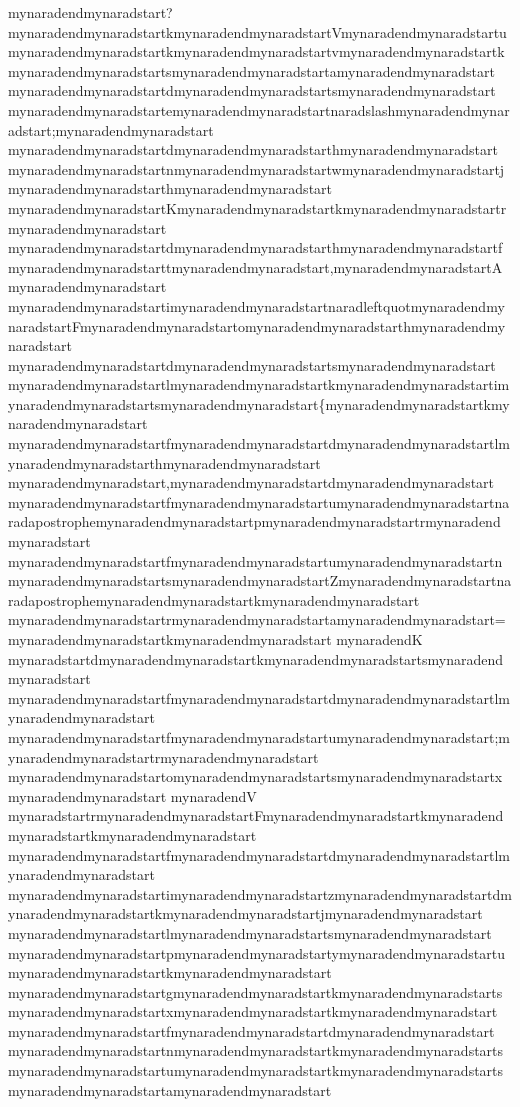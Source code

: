 \documentclass{scrbook}
\begin{document}
mynaradendmynaradstart?mynaradendmynaradstartkmynaradendmynaradstartVmynaradendmynaradstartumynaradendmynaradstartkmynaradendmynaradstartvmynaradendmynaradstartkmynaradendmynaradstartsmynaradendmynaradstartamynaradendmynaradstart mynaradendmynaradstartdmynaradendmynaradstartsmynaradendmynaradstart mynaradendmynaradstartemynaradendmynaradstartnaradslashmynaradendmynaradstart;mynaradendmynaradstart mynaradendmynaradstartdmynaradendmynaradstarthmynaradendmynaradstart mynaradendmynaradstartnmynaradendmynaradstartwmynaradendmynaradstartjmynaradendmynaradstarthmynaradendmynaradstart mynaradendmynaradstartKmynaradendmynaradstartkmynaradendmynaradstartrmynaradendmynaradstart mynaradendmynaradstartdmynaradendmynaradstarthmynaradendmynaradstartfmynaradendmynaradstarttmynaradendmynaradstart,mynaradendmynaradstartAmynaradendmynaradstart mynaradendmynaradstartimynaradendmynaradstartnaradleftquotmynaradendmynaradstartFmynaradendmynaradstartomynaradendmynaradstarthmynaradendmynaradstart mynaradendmynaradstartdmynaradendmynaradstartsmynaradendmynaradstart mynaradendmynaradstartlmynaradendmynaradstartkmynaradendmynaradstartimynaradendmynaradstartsmynaradendmynaradstart\{mynaradendmynaradstartkmynaradendmynaradstart mynaradendmynaradstartfmynaradendmynaradstartdmynaradendmynaradstartlmynaradendmynaradstarthmynaradendmynaradstart mynaradendmynaradstart,mynaradendmynaradstartdmynaradendmynaradstart mynaradendmynaradstartfmynaradendmynaradstartumynaradendmynaradstartnaradapostrophemynaradendmynaradstartpmynaradendmynaradstartrmynaradendmynaradstart mynaradendmynaradstartfmynaradendmynaradstartumynaradendmynaradstartnmynaradendmynaradstartsmynaradendmynaradstartZmynaradendmynaradstartnaradapostrophemynaradendmynaradstartkmynaradendmynaradstart mynaradendmynaradstartrmynaradendmynaradstartamynaradendmynaradstart=mynaradendmynaradstartkmynaradendmynaradstart mynaradendK mynaradstartdmynaradendmynaradstartkmynaradendmynaradstartsmynaradendmynaradstart mynaradendmynaradstartfmynaradendmynaradstartdmynaradendmynaradstartlmynaradendmynaradstart mynaradendmynaradstartfmynaradendmynaradstartumynaradendmynaradstart;mynaradendmynaradstartrmynaradendmynaradstart mynaradendmynaradstartomynaradendmynaradstartsmynaradendmynaradstartxmynaradendmynaradstart mynaradendV mynaradstartrmynaradendmynaradstartFmynaradendmynaradstartkmynaradendmynaradstartkmynaradendmynaradstart mynaradendmynaradstartfmynaradendmynaradstartdmynaradendmynaradstartlmynaradendmynaradstart mynaradendmynaradstartimynaradendmynaradstartzmynaradendmynaradstartdmynaradendmynaradstartkmynaradendmynaradstartjmynaradendmynaradstart mynaradendmynaradstartlmynaradendmynaradstartsmynaradendmynaradstart mynaradendmynaradstartpmynaradendmynaradstartymynaradendmynaradstartumynaradendmynaradstartkmynaradendmynaradstart mynaradendmynaradstartgmynaradendmynaradstartkmynaradendmynaradstartsmynaradendmynaradstartxmynaradendmynaradstartkmynaradendmynaradstart mynaradendmynaradstartfmynaradendmynaradstartdmynaradendmynaradstart mynaradendmynaradstartnmynaradendmynaradstartkmynaradendmynaradstartsmynaradendmynaradstartumynaradendmynaradstartkmynaradendmynaradstartsmynaradendmynaradstartamynaradendmynaradstart 
\end{document}
